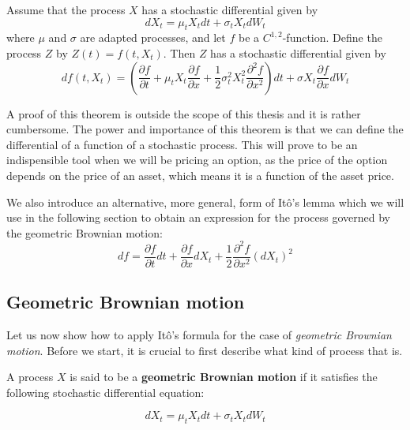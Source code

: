 \documentclass[times, utf8, diplomski]{fer}
\begin{document}
\begin{theorem}[It\^{o}'s Lemma]
Assume that the process $X$ has a stochastic differential given by $$dX_t = \mu_t X_t dt + \sigma_t X_t dW_t$$ where $\mu$ and $\sigma$ are adapted processes, and let $f$ be a $C^{1,2}$-function. Define the process $Z$ by $Z(t) = f(t,X_t)$. Then $Z$ has a stochastic differential given by 
$$df(t, X_t) = \left(\frac{\partial f}{\partial t} + \mu_t X_t \frac{\partial f}{\partial x}+\frac{1}{2}\sigma_t^2 X_t^2 \frac{\partial^2f}{\partial x^2}\right)dt + \sigma X_t \frac{\partial f}{\partial x}dW_t$$
\end{theorem}
\noindent A proof of this theorem is outside the scope of this thesis and it is rather cumbersome. The power and importance of this theorem is that we can define the differential of a function of a stochastic process. This will prove to be an indispensible tool when we will be pricing an option, as the price of the option depends on the price of an asset, which means it is a function of the asset price. 

\noindent We also introduce an alternative, more general, form of It\^{o}'s lemma which we will use in the following section to obtain an expression for the process governed by the geometric Brownian motion:
\begin{equation} \label{eqn:ito_general}
	df = \frac{\partial f}{\partial t}dt + \frac{\partial f}{\partial x}dX_t + \frac{1}{2}\frac{\partial^2 f}{\partial x^2}(dX_t)^2
\end{equation}

\subsection{Geometric Brownian motion} \label{section_gbm}
Let us now show how to apply It\^{o}'s formula for the case of \textit{geometric Brownian motion}. Before we start, it is crucial to first describe what kind of process that is. 

\begin{definition}
A process $X$ is said to be a \textbf{geometric Brownian motion} if it satisfies the following stochastic differential equation:

\begin{equation}
	dX_t = \mu_t X_t dt + \sigma_t X_t dW_t
\end{equation}

\end{definition}
\end{document}
